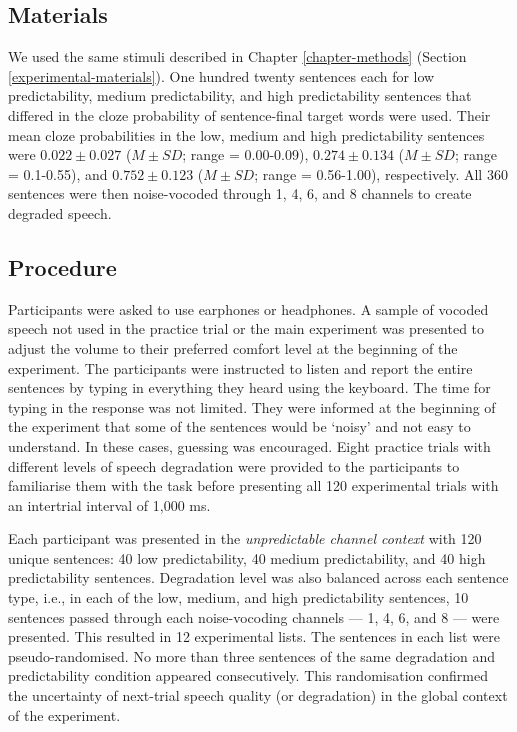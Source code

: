 \documentclass[a4paper, nobind]{templates/ociamthesis}
\begin{document}
\hypertarget{materials-1}{%
\subsection{Materials}\label{materials-1}}

We used the same stimuli described in Chapter \ref{chapter-methods} (Section \ref{experimental-materials}).
One hundred twenty sentences each for low predictability, medium predictability, and high predictability sentences that differed in the cloze probability of sentence-final target words were used.
Their mean cloze probabilities in the low, medium and high predictability sentences were \(0.022\pm0.027\) (\(M\pm SD\); range = 0.00-0.09), \(0.274\pm0.134\) (\(M\pm SD\); range = 0.1-0.55), and \(0.752\pm0.123\) (\(M\pm SD\); range = 0.56-1.00), respectively.
All 360 sentences were then noise-vocoded through 1, 4, 6, and 8 channels to create degraded speech.

\hypertarget{procedure-2}{%
\subsection{Procedure}\label{procedure-2}}

Participants were asked to use earphones or headphones.
A sample of vocoded speech not used in the practice trial or the main experiment was presented to adjust the volume to their preferred comfort level at the beginning of the experiment.
The participants were instructed to listen and report the entire sentences by typing in everything they heard using the keyboard.
The time for typing in the response was not limited.
They were informed at the beginning of the experiment that some of the sentences would be `noisy' and not easy to understand.
In these cases, guessing was encouraged.
Eight practice trials with different levels of speech degradation were provided to the participants to familiarise them with the task before presenting all 120 experimental trials with an intertrial interval of 1,000 ms.

Each participant was presented in the \emph{unpredictable channel context} with 120 unique sentences: 40 low predictability, 40 medium predictability, and 40 high predictability sentences.
Degradation level was also balanced across each sentence type, i.e., in each of the low, medium, and high predictability sentences, 10 sentences passed through each noise-vocoding channels --- 1, 4, 6, and 8 --- were presented.
This resulted in 12 experimental lists.
The sentences in each list were pseudo-randomised.
No more than three sentences of the same degradation and predictability condition appeared consecutively.
This randomisation confirmed the uncertainty of next-trial speech quality (or degradation) in the global context of the experiment.
\end{document}
